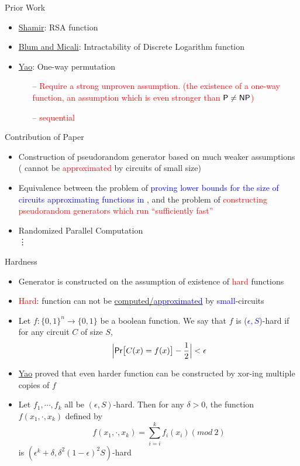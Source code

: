 \documentclass[xcolor={table,dvipsnames,usenames}]{beamer}
\begin{document}
\begin{frame}{Prior Work}
\begin{itemize}
	\item \href{https://link.springer.com/chapter/10.1007/3-540-10843-2_43}{Shamir}: RSA function
	\item  \href{https://dl.acm.org/citation.cfm?id=2068}{Blum and Micali}: Intractability of Discrete Logarithm function
	\item \href{https://ieeexplore.ieee.org/document/4568378}{Yao}: One-way permutation
	\pause
	\begin{itemize}
		\item[--] \textcolor{red}{Require a strong unproven assumption. (the existence of a one-way function, an assumption which is even stronger than $ \mathsf{P} \neq \mathsf{NP}$)}
		\item[--] \textcolor{red}{sequential}
	\end{itemize}
\end{itemize}
\end{frame}
\begin{frame}{Contribution of Paper}
\begin{itemize}
	\item Construction of pseudorandom generator based on much weaker assumptions ({\EXPTIME} cannot be \textcolor{red}{approximated} by circuits of small size)
	\pause
	\item Equivalence between the problem of \textcolor{blue}{proving lower bounds for the size of circuits approximating functions in {\EXPTIME}}, and the problem of \textcolor{red}{constructing pseudorandom generators which run ``sufficiently fast''}
	\pause
	\item Randomized Parallel Computation\\
	\pause
	\quad \quad \vdots
\end{itemize}
\end{frame}
\begin{frame}{Hardness}
\begin{itemize}
	\item Generator is constructed on the assumption of existence of \textcolor{red}{hard} functions
	\pause
	\item \textcolor{red}{Hard}: function can not be \underline{computed/\textcolor{blue}{approximated}} by \textcolor{blue}{small}-circuits
	\pause
	\item  Let $f:\{0,1\}^n \rightarrow \{0, 1\}$ be a boolean function. We say that $f$ is (\textcolor{blue}{$\epsilon,S$})-hard if for any circuit $C$ of size $S$,
	$$\Big|\mathsf{Pr}\big[C(x)=f(x)\big]- \frac{1}{2}\Big| < \epsilon$$
	\pause
	\item \href{https://ieeexplore.ieee.org/document/4568378/}{Yao} proved that even harder function can be constructed by xor-ing multiple copies of $f$
	\pause
	\item Let $f_1, \cdots, f_k$ all be $(\epsilon,S)$-hard. Then for any $\delta>0$, the function $f(x_1, \cdot, x_k)$ defined by
	$$f(x_1, \cdot, x_k)= \sum_{i = i}^{k} f_i(x_i) (mod~2)$$
	is  $(\epsilon^k + \delta, \delta^2(1-\epsilon)^2S)$-hard
\end{itemize}
\end{frame}
\end{document}
